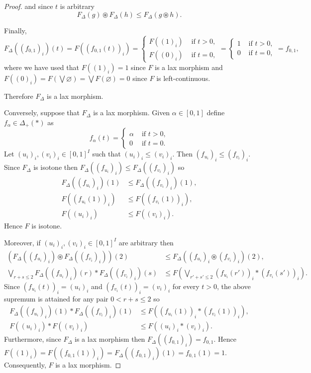 \documentclass[11pt,a4paper]{amsart}
\theoremstyle{definition}
\begin{document}
\begin{proof}
		and since $t$ is arbitrary
		$$ F_\Delta(g)\circledast F_\Delta(h)\leq F_\Delta(g\circledast h).$$
		
		Finally, 
		$$F_\Delta((f_{0,1})_i)(t)=F((f_{0,1}(t))_i)=\begin{cases}
			F((1)_i)&\text{ if }t>0,\\
			F((0)_i)&\text{ if }t=0,
		\end{cases}=\begin{cases}
			1&\text{ if }t>0,\\
			0&\text{ if }t=0,
		\end{cases}=f_{0,1},$$
		where we have used that $F((1)_i)=1$ since $F$ is a lax morphism and $F((0)_i)=F(\bigvee \varnothing)=\bigvee F(\varnothing)=0$ since $F$ is left-continuous.
		
		Therefore $F_\Delta$ is a lax morphism.
		
		
		Conversely, suppose that $F_\Delta$ is a lax morphism. Given $\alpha\in [0,1]$ define $f_\alpha\in\Delta_+(\ast)$ as
		$$f_\alpha(t)=\begin{cases}\alpha&\text{ if }t>0,\\
			0&\text{ if }t=0.\end{cases}$$
		Let $(u_i)_i,(v_i)_i\in [0,1]^I$ such that $(u_i)_i\leq (v_i)_i$. Then $(f_{u_i})_i\leq (f_{v_i})_i.$ Since $F_\Delta$ is isotone then $F_\Delta((f_{u_i})_i)\leq F_\Delta((f_{v_i})_i)$ so \begin{align*}
			F_\Delta((f_{u_i})_i)(1)&\leq F_\Delta((f_{v_i})_i)(1),\\
			F((f_{u_i}(1))_i)&\leq	F((f_{v_i}(1))_i),\\
			F((u_i)_i)&\leq F((v_i)_i).
		\end{align*}
		Hence $F$ is isotone.
		
		Moreover, if $(u_i)_i,(v_i)_i\in [0,1]^I$ are arbitrary then 
		\begin{align*}
			(F_\Delta((f_{u_i})_i)\circledast F_\Delta((f_{v_i})_i))(2)&\leq F_\Delta((f_{u_i})_i\circledast(f_{v_i})_i )(2),\\
			\bigvee_{r+s\leq 2} F_\Delta((f_{u_i})_i)(r)\ast  F_\Delta((f_{v_i})_i)(s)&\leq F\left(\bigvee_{r'+s'\leq 2} (f_{u_i}(r'))_i\ast (f_{v_i}(s'))_i\right).
		\end{align*}
		Since $(f_{u_i}(t))_i=(u_i)_i$ and $(f_{v_i}(t))_i=(v_i)_i$ for every $t>0$, the above supremum is attained for any pair $0<r+s\leq 2$ so 
		\begin{align*}
			F_\Delta((f_{u_i})_i)(1)\ast  F_\Delta((f_{v_i})_i)(1)&\leq F((f_{u_i}(1))_i\ast (f_{v_i}(1))_i),\\
			F((u_i)_i)\ast F((v_i)_i)&\leq F((u_i)_i\ast (v_i)_i).
		\end{align*}
		Furthermore, since $F_\Delta$ is a lax morphism then $F_\Delta((f_{0,1})_i)=f_{0,1}.$ Hence $F((1)_i)=F((f_{0,1}(1))_i)=F_\Delta((f_{0,1})_i)(1)=f_{0,1}(1)=1$. Consequently, $F$ is a lax morphism.
		

\end{proof}
\end{document}
